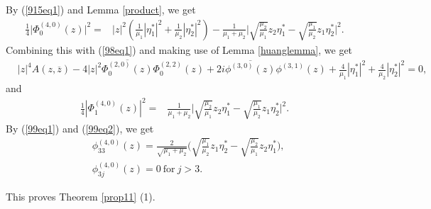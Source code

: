 \documentclass[12pt]{article}
\numberwithin{equation}{section}
\def\ov{\overline}
\begin{document}
By (\ref{915eq1}) and Lemma \ref{product}, we get
\begin{equation}\begin{split}
\frac{1}{4}\big|\Phi_0^{(4,0)}(z)\big|^2
       =&|z|^2(\frac{1}{\mu_1}|\eta^*_1|^2
       +\frac{1}{\mu_2}|\eta^*_2|^2)-\frac{1}{\mu_1+\mu_2}
        \big|\sqrt{\frac{\mu_2}{\mu_1}}z_2\eta^*_1-\sqrt{\frac{\mu_1}{\mu_2}}z_1\eta^*_2\big|^2.
\end{split}\end{equation}
Combining this with (\ref{98eq1}) and making use of  Lemma
\ref{huanglemma}, we get
\begin{equation}\begin{split}\label{97eq6}
& |z|^4A(z,\ov{z})-4|z|^2\ov{\Phi_0^{(2,0)}(z)}\Phi_0^{(2,2)}(z)+
2i\ov{\phi^{(3,0)}(z)}\phi^{(3,1)}(z)+\frac{4}{\mu_1}|\eta^*_1|^2
       +\frac{4}{\mu_2}|\eta^*_2|^2=0,
\end{split}\end{equation}
and
\begin{equation}\begin{split}\label{99eq2}
\frac{1}{4}|\Phi_1^{(4,0)}(z)|^2=&\frac{1}{\mu_1+\mu_2}
        \big|\sqrt{\frac{\mu_2}{\mu_1}}z_2\eta^*_1-\sqrt{\frac{\mu_1}{\mu_2}}z_1\eta^*_2\big|^2.
\end{split}\end{equation}
By (\ref{99eq1}) and (\ref{99eq2}), we get
\begin{equation}\begin{split}
&{\phi}_{33}^{(4,0)}(z)=\frac{2}{\sqrt{\mu_1+\mu_2}}\Big(\sqrt{\frac{\mu_1}{\mu_2}}z_1\eta^*_2
-\sqrt{\frac{\mu_2}{\mu_1}}z_2\eta^*_1\Big),\\
&{\phi}_{3j}^{(4,0)}(z)=0\ \text{for}\ j>3.
\end{split}\end{equation}

This proves Theorem \ref{prop11} (1).
\end{document}
